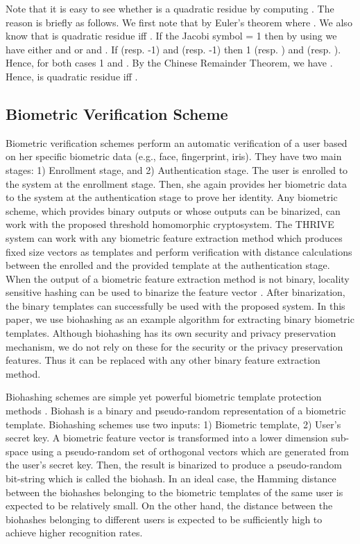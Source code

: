 \documentclass[journal]{IEEEtran}
\begin{document}
Note that it is easy to see whether  is a quadratic residue by computing   . The reason is briefly as follows. We first note that by Euler's theorem  where   . We also know that  is quadratic residue iff . If the Jacobi symbol    = 1 then by using     we have either  and  or  and . If    (resp. -1) and    (resp. -1) then   1  (resp. ) and     (resp. ). Hence, for both cases   1  and    . By the Chinese Remainder Theorem, we have    . Hence,  is quadratic residue iff .

\subsection{Biometric Verification Scheme}

Biometric verification schemes perform an automatic verification of a user based on her specific biometric data (e.g., face, fingerprint, iris). They have two main stages: 1) Enrollment stage, and 2) Authentication stage. The user is enrolled to the system at the enrollment stage. Then, she again provides her biometric data to the system at the authentication stage to prove her identity. Any biometric scheme, which provides binary outputs or whose outputs can be binarized, can work with the proposed threshold homomorphic cryptosystem. The THRIVE system can work with any biometric feature extraction method which produces fixed size vectors as templates and perform verification with distance calculations between the enrolled and the provided template at the authentication stage. When the output of a biometric feature extraction method is not binary, locality sensitive hashing can be used to binarize the feature vector \cite{gionis}. After binarization, the binary templates can successfully be used with the proposed system. In this paper, we use biohashing as an example algorithm for extracting binary biometric templates. Although biohashing has its own security and privacy preservation mechanism, we do not rely on these for the security or the privacy preservation features. Thus it can be replaced with any other binary feature extraction method.


Biohashing schemes are simple yet powerful biometric template protection methods \cite{Karabat, Bai, Kuan, Rathgeb, Lumini}. Biohash is a binary and pseudo-random representation of a biometric template. Biohashing schemes use two inputs: 1) Biometric template, 2) User's secret key. A biometric feature vector is transformed into a lower dimension sub-space using a pseudo-random set of orthogonal vectors which are generated from the user's secret key. Then, the result is binarized to produce a pseudo-random bit-string which is called the biohash. In an ideal case, the Hamming distance between the biohashes belonging to the biometric templates of the same user is expected to be relatively small. On the other hand, the distance between the biohashes belonging to different users is expected to be sufficiently high to achieve higher recognition rates.  
\end{document}
